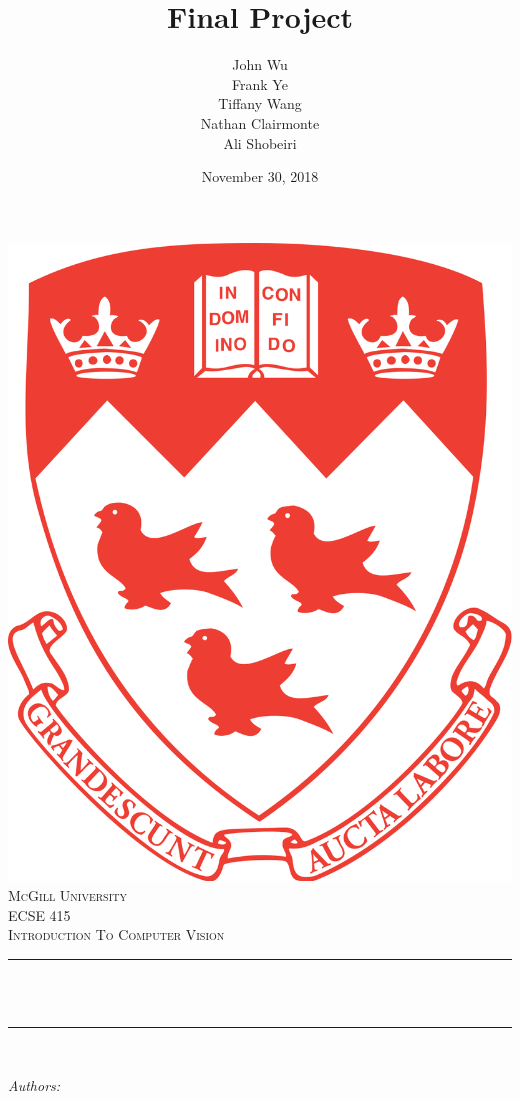 \documentclass[12pt]{article}
\title{Final Project}  %
\author{John Wu \\ 
        Frank Ye \\ 
        Tiffany Wang \\ 
        Nathan Clairmonte \\ 
        Ali Shobeiri}  %
\date{November 30, 2018} %
\makeatletter
\let\thetitle\@title
\let\theauthor\@author
\makeatother
\begin{document}
\begin{titlepage}
    \centering
    \vspace*{0.5 cm}
    \includegraphics[scale = 0.07]{report/mcgill-logo.png}\\[1.0 cm]   %
    \textsc{\LARGE McGill University}\\[1.0 cm]   %
    \textsc{\Large ECSE 415}\\[0.5 cm]               %
    \textsc{\large Introduction To Computer Vision}\\[0.5 cm]               %
    \rule{\linewidth}{0.2 mm} \\[0.4 cm]
    { \huge \bfseries \thetitle}\\
    \rule{\linewidth}{0.2 mm} \\[1.5 cm]
    \begin{minipage}{0.4\textwidth}
        \begin{flushleft} \large
            \emph{Authors:}\\
            \theauthor

\end{flushleft}
\end{minipage}
\end{titlepage}
\end{document}
